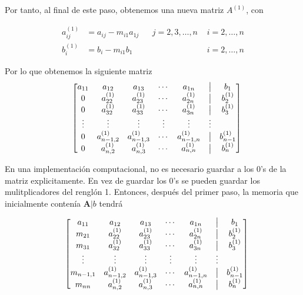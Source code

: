 \documentclass[
]{article}
\begin{document}
Por tanto, al final de este paso, obtenemos una nueva matriz
\(A^{(1)}\), con

\begin{equation}
\begin{array}{ccccc}
a^{(1)}_{ij} & = a_{ij} - m_{i1}a_{1j}& & j=2,3,\ldots,n\,\,& i=2,\ldots,n\\
b^{(1)}_{i}  & = b_{i}  - m_{i1}b_{1} & & \,\               & i=2,\ldots,n
\end{array}
\end{equation}

Por lo que obtenemos la siguiente matriz \begin{equation*}
\begin{array}{cc}
 &  \begin{bmatrix} 
     a_{11} & a_{12}            & a_{13}           & \cdots & a_{1n}        & \bigm| & b_1      \\ 
     0      & a^{(1)}_{22}      & a^{(1)}_{23}     & \cdots & a^{(1)}_{2n}  & \bigm| & b_2^{(1)}\\
     0      & a^{(1)}_{32}      & a^{(1)}_{33}     & \cdots & a^{(1)}_{3n}  & \bigm| & b_3^{(1)}\\
    \vdots  & \vdots            & \vdots           & \vdots & \vdots        & \vdots & \\
     0      & a^{(1)}_{n-1,2}   & a^{(1)}_{n-1,3}  & \cdots & a^{(1)}_{n-1,n}& \bigm|& b_{n-1}^{(1)}\\
     0      & a^{(1)}_{n,2}     & a^{(1)}_{n,3}    & \cdots & a^{(1)}_{n,n}& \bigm| & b_{n}^{(1)}\\
  \end{bmatrix}
\end{array}
\end{equation*}

En una implementación computacional, no es necesario guardar a los
\(0\)'s de la matriz explicitamente. En vez de guardar los \(0\)'s se
pueden guardar los mulitplicadores del renglón 1. Entonces, después del
primer paso, la memoria que inicialmente contenía \(\mathbf{A}|b\)
tendrá

\begin{equation}
\begin{array}{cc}
 &  \begin{bmatrix} 
     a_{11} & a_{12}            & a_{13}           & \cdots & a_{1n}        & \bigm| &b_1      \\ 
     m_{21} & a^{(1)}_{22}      & a^{(1)}_{23}     & \cdots & a^{(1)}_{2n}  & \bigm| &b_2^{(1)}\\
     m_{31} & a^{(1)}_{32}      & a^{(1)}_{33}     & \cdots & a^{(1)}_{3n}  & \bigm| &b_3^{(1)}\\
    \vdots  & \vdots            & \vdots           & \vdots & \vdots        & \vdots &\\
 m_{n-1,1}  & a^{(1)}_{n-1,2}   & a^{(1)}_{n-1,3}  & \cdots & a^{(1)}_{n-1,n}& \bigm| & b_{n-1}^{(1)}\\
     m_{nn} & a^{(1)}_{n,2}     & a^{(1)}_{n,3}    & \cdots & a^{(1)}_{n,n}& \bigm| &b_{n}^{(1)}\\
  \end{bmatrix}
\end{array}
\end{equation}
\end{document}
